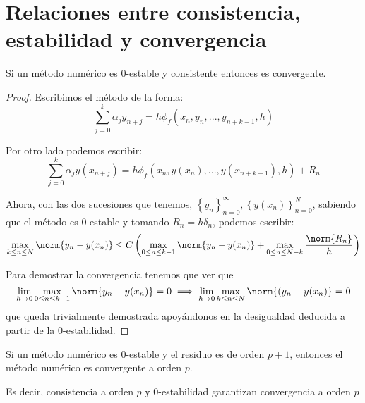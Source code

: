 \section{Relaciones entre consistencia, estabilidad y convergencia}
\begin{theorem}\label{theorem:consist_y_0estable_converge}
Si un método numérico es 0-estable y consistente entonces es convergente.
\end{theorem}
\begin{proof}
Escribimos el método de la forma:
\[\sum_{j=0}^kα_jy_{n+j} = h \phi_f(x_n,y_n,...,y_{n+k-1},h)\]

Por otro lado podemos escribir:
\[\sum_{j=0}^kα_jy(x_{n+j}) = h \phi_f(x_n,y(x_n),...,y(x_{n+k-1}),h) + R_n\]

Ahora, con las dos sucesiones que tenemos, $\left\{y_n\right\}_{n=0}^∞, \left\{y(x_n)\right\}_{n=0}^N$, sabiendo que el método es 0-estable y tomando $R_n=hδ_n$, podemos escribir:
\[\max_{k\leq n \leq N}\norm{y_n-y(x_n)} \leq C\left( \max_{0 \leq n \leq k-1} \norm{y_n-y(x_n)} + \max_{0 \leq n \leq N-k} \frac{\norm{R_n}}{h}\right)\]

Para demostrar la convergencia tenemos que ver que 
\[\lim_{h \to 0} \max_{0 \leq n \leq k-1} \norm{y_n-y(x_n)}= 0 \implies \lim_{h\to 0} \max_{k\leq n \leq N}\norm{(y_n-y(x_n)}=0 \]
que queda trivialmente demostrada apoyándonos en la desigualdad deducida a partir de la 0-estabilidad.
\end{proof}

\begin{theorem}\label{theorem:convergencia_consistencia_orden}
Si un método numérico es 0-estable y el residuo es de orden $p+1$, entonces el método numérico es convergente a orden $p$.

Es decir, consistencia a orden $p$ y 0-estabilidad garantizan convergencia a orden $p$
\end{theorem}

